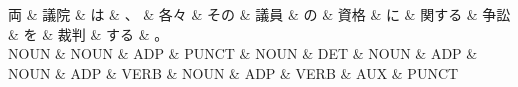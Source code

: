 \documentclass[tikz,border=5pt]{standalone}
\begin{document}
\normalsize
\begin{dependency}[edge unit distance=12.0pt]
    \begin{deptext}[column sep=1em]
        両 \& 議院 \& は \& 、 \& 各々 \& その \& 議員 \& の \& 資格 \& に \& 関する \& 争訟 \& を \& 裁判 \& する \& 。\\
        NOUN \& NOUN \& ADP \& PUNCT \& NOUN \& DET \& NOUN \& ADP \& NOUN \& ADP \& VERB \& NOUN \& ADP \& VERB \& AUX \& PUNCT\\
    \end{deptext}
\end{dependency}
\end{document}
